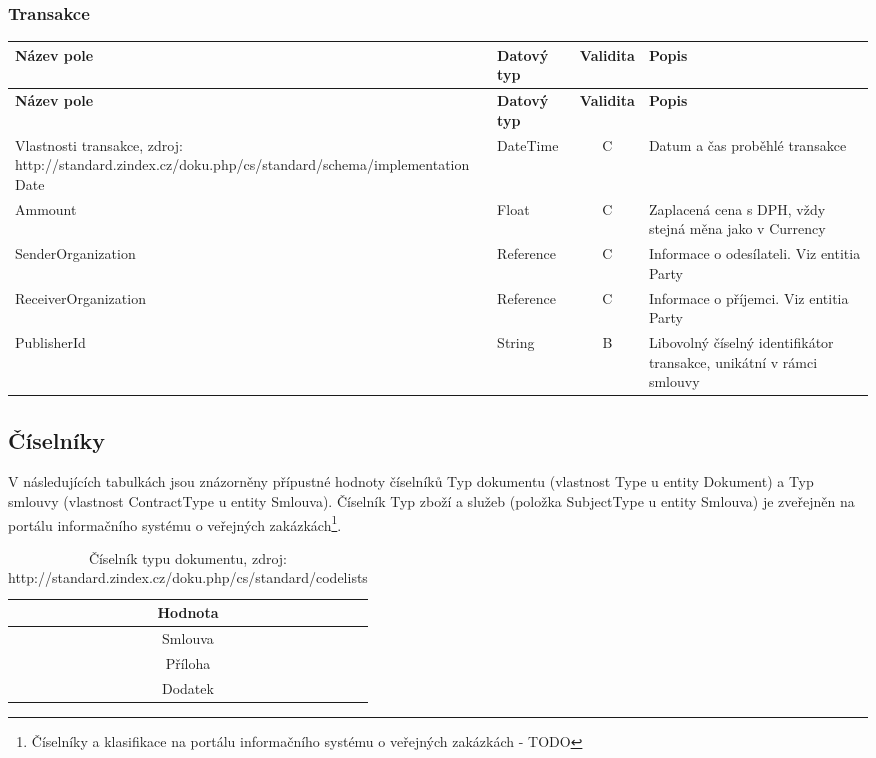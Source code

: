 \subsubsection*{Transakce}

\begin{center}
\begin{longtable}{lp{20mm}cp{65mm}}
\label{grid_mlmmh} \\
\multicolumn{1}{l}{\textbf{Název pole}} & 
\multicolumn{1}{l}{\textbf{Datový typ}} & 
\multicolumn{1}{l}{\textbf{Validita}} & 
\multicolumn{1}{l}{\textbf{Popis}} \\ \hline 
\endfirsthead
\multicolumn{1}{l}{\textbf{Název pole}} & 
\multicolumn{1}{l}{\textbf{Datový typ}} & 
\multicolumn{1}{l}{\textbf{Validita}} & 
\multicolumn{1}{l}{\textbf{Popis}} \\ \hline 
\hline
\endhead
\endfoot
\caption{Vlastnosti transakce, zdroj:\\http://standard.zindex.cz/doku.php/cs/standard/schema/implementation}
\endlastfoot
\rowcolor{validateC}Date & DateTime & C & Datum a čas proběhlé transakce \\
\rowcolor{validateC}Ammount & Float & C & Zaplacená cena s DPH, vždy stejná měna jako v Currency \\
\rowcolor{validateC}SenderOrganization & Reference & C & Informace o odesílateli. Viz entitia Party \\
\rowcolor{validateC}ReceiverOrganization & Reference & C & Informace o příjemci. Viz entitia Party \\
\rowcolor{validateB}PublisherId & String & B & Libovolný číselný identifikátor transakce, unikátní v rámci smlouvy \\
\end{longtable}
\end{center}

\subsection{Číselníky}

V následujících tabulkách jsou znázorněny přípustné hodnoty číselníků Typ dokumentu (vlastnost Type u entity Dokument) a Typ smlouvy (vlastnost ContractType u entity Smlouva). Číselník Typ zboží a služeb (položka SubjectType u entity Smlouva) je zveřejněn na portálu informačního systému o veřejných zakázkách\footnote{Číselníky a klasifikace na portálu informačního systému o veřejných zakázkách - TODO}.

\begin{table}[h]
\centering
\begin{tabular}{c}
\textbf{Hodnota} \\
\hline
\rowcolor{validateB}Smlouva \\
\rowcolor{validateB}Příloha \\
\rowcolor{validateB}Dodatek \\
\end{tabular}
\caption{Číselník typu dokumentu, zdroj:\\http://standard.zindex.cz/doku.php/cs/standard/codelists}
\end{table}

